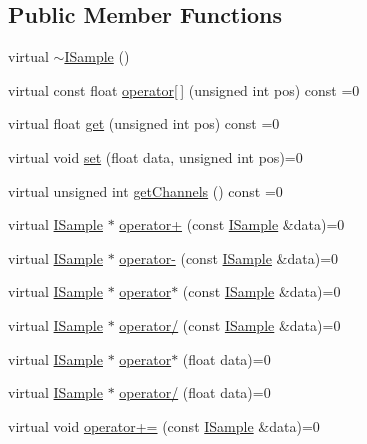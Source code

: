 \subsection*{Public Member Functions}
\begin{DoxyCompactItemize}
\item 
virtual \hyperlink{classmaudio_1_1ISample_ad4b8a6224f76943f9a10e6d5bb16a1fd}{$\sim$\-I\-Sample} ()
\item 
virtual const float \hyperlink{classmaudio_1_1ISample_ad90962cd3f480cbba7a891530371e405}{operator\mbox{[}$\,$\mbox{]}} (unsigned int pos) const =0
\item 
virtual float \hyperlink{classmaudio_1_1ISample_a2a1eef822e43d5807a7ff3e9798783c6}{get} (unsigned int pos) const =0
\item 
virtual void \hyperlink{classmaudio_1_1ISample_a0b65702ea137559932feee764cfc190e}{set} (float data, unsigned int pos)=0
\item 
virtual unsigned int \hyperlink{classmaudio_1_1ISample_a2c05b7da59cc625f695352a11a81351c}{get\-Channels} () const =0
\item 
virtual \hyperlink{classmaudio_1_1ISample}{I\-Sample} $\ast$ \hyperlink{classmaudio_1_1ISample_abd3ff392a72c89576b111dd4120eb2b0}{operator+} (const \hyperlink{classmaudio_1_1ISample}{I\-Sample} \&data)=0
\item 
virtual \hyperlink{classmaudio_1_1ISample}{I\-Sample} $\ast$ \hyperlink{classmaudio_1_1ISample_a654eb71ce13136f6f8a1299daab81a85}{operator-\/} (const \hyperlink{classmaudio_1_1ISample}{I\-Sample} \&data)=0
\item 
virtual \hyperlink{classmaudio_1_1ISample}{I\-Sample} $\ast$ \hyperlink{classmaudio_1_1ISample_aa7dcb9e5e605bb8b3bb18c0d64d0f98f}{operator$\ast$} (const \hyperlink{classmaudio_1_1ISample}{I\-Sample} \&data)=0
\item 
virtual \hyperlink{classmaudio_1_1ISample}{I\-Sample} $\ast$ \hyperlink{classmaudio_1_1ISample_a11fd4f5c355e90f67317881618289b4b}{operator/} (const \hyperlink{classmaudio_1_1ISample}{I\-Sample} \&data)=0
\item 
virtual \hyperlink{classmaudio_1_1ISample}{I\-Sample} $\ast$ \hyperlink{classmaudio_1_1ISample_ace42669d0bb902e6237c6aa491f3177d}{operator$\ast$} (float data)=0
\item 
virtual \hyperlink{classmaudio_1_1ISample}{I\-Sample} $\ast$ \hyperlink{classmaudio_1_1ISample_a48dfc510f76abb0981c8edb79f737c09}{operator/} (float data)=0
\item 
virtual void \hyperlink{classmaudio_1_1ISample_a3000493ce6c2d3fccc88565360170ff7}{operator+=} (const \hyperlink{classmaudio_1_1ISample}{I\-Sample} \&data)=0

\end{DoxyCompactItemize}
